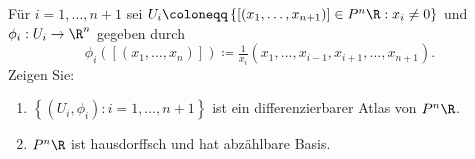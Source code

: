 \begin{assignment}
  Für \( i = 1,\dots,n+1 \) sei \( U_i \coloneqq \left \{ [\left( x_1,\dots,x_{n+1} \right)] \in P^n\R : x_i \neq 0 \right \} \) und \( \phi_i : U_i \to \R^n \) gegeben durch
  \begin{equation*}
    \phi_i\left( [(x_1,\dots,x_n)] \right) \coloneqq \tfrac{1}{x_i}(x_1,\dots,x_{i-1},x_{i+1},\dots,x_{n+1})\text{.}
  \end{equation*}
  Zeigen Sie:
  \begin{enumerate}[label=(\alph*)]
    \item \( \left \{ (U_i,\phi_i) : i = 1,\dots,n+1 \right \} \) ist ein differenzierbarer Atlas von \( P^n\R \).
    \item \( P^n\R \) ist hausdorffsch und hat abzählbare Basis.
  \end{enumerate}
\end{assignment}
